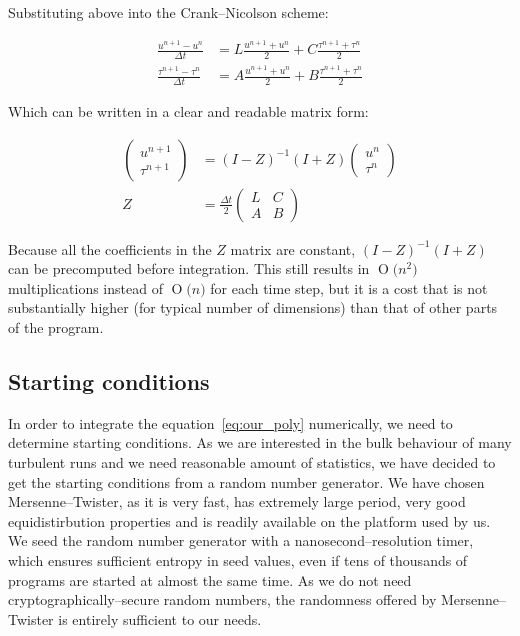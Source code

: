 \documentclass[11pt,a4paper]{article}
\newcommand{\BigO}[1]{\ensuremath{\operatorname{O}\bigl(#1\bigr)}}
\begin{document}
Substituting above into the Crank--Nicolson scheme:

\begin{equation}\label{eq:cn_ops}
    \begin{aligned}
        \frac{u^{n+1} - u^n}{\Delta t} &= L\frac{u^{n+1} + u^n}{2} + C\frac{\tau^{n+1} + \tau^n}{2} \\
        \frac{\tau^{n+1} - \tau^n}{\Delta t} &= A\frac{u^{n+1} + u^n}{2} + B\frac{\tau^{n+1} + \tau^n}{2}
    \end{aligned}
\end{equation}

Which can be written in a clear and readable matrix form:

\begin{equation}\label{eq:cn_simpl}
    \begin{aligned}
        \begin{pmatrix}
            u^{n+1} \\
            \tau^{n+1}
        \end{pmatrix} &= (I - Z)^{-1} (I + Z) \begin{pmatrix} u^n \\ \tau^n \end{pmatrix} \\
            Z &= \frac{\Delta t}{2}\begin{pmatrix}
            L & C \\
            A & B
        \end{pmatrix}
    \end{aligned}
\end{equation}

Because all the coefficients in the $Z$ matrix are constant, $(I - Z)^{-1}(I + Z)$ can be precomputed before integration.
This still results in \BigO{n^2} multiplications instead of \BigO{n} for each time step, but it is a cost that is not substantially higher (for typical number of dimensions) than that of other parts of the program.

\subsection{Starting conditions}
In order to integrate the equation~\eqref{eq:our_poly} numerically, we need to determine starting conditions.
As we are interested in the bulk behaviour of many turbulent runs and we need reasonable amount of statistics, we have decided to get the starting conditions from a random number generator.
We have chosen Mersenne--Twister\cite{Matsumoto98}, as it is very fast, has extremely large period, very good equidistirbution properties and is readily available on the platform used by us.
We seed the random number generator with a nanosecond--resolution timer, which ensures sufficient entropy in seed values, even if tens of thousands of programs are started at almost the same time.
As we do not need cryptographically--secure random numbers, the randomness offered by Mersenne--Twister is entirely sufficient to our needs.
\end{document}
